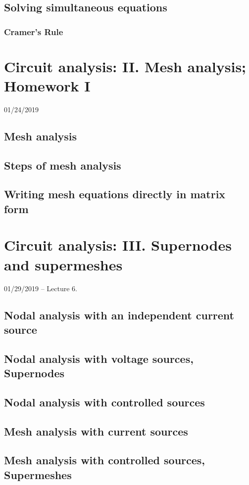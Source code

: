 \documentclass[11pt]{book}
\begin{document}
\section{Solving simultaneous equations}
\subsection{Cramer's Rule}



\chapter{Circuit analysis: II. Mesh analysis; Homework I}
01/24/2019
\section{Mesh analysis}
\section{Steps of mesh analysis}
\section{Writing mesh equations directly in matrix form}



\chapter{Circuit analysis: III. Supernodes and supermeshes}
01/29/2019 – Lecture 6. 
\section{Nodal analysis with an independent current source}
\section{Nodal analysis with voltage sources, \textbf{Supernodes}}
\section{Nodal analysis with controlled sources}
\section{Mesh analysis with current sources}
\section{Mesh analysis with controlled sources, \textbf{Supermeshes}}
\end{document}
